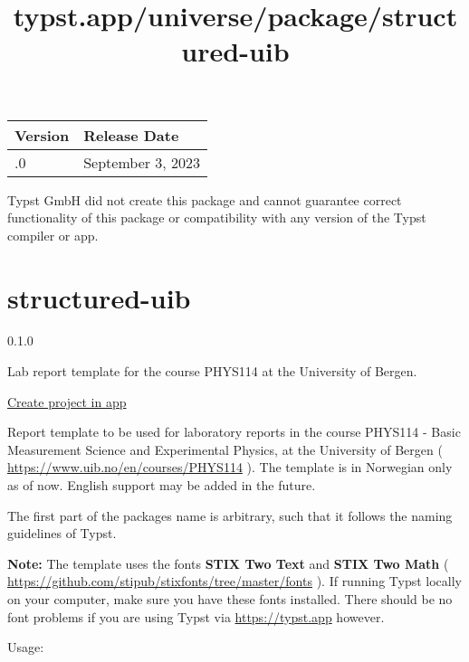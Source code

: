 \begin{longtable}[]{@{}ll@{}}
\toprule\noalign{}
Version & Release Date \\
\midrule\noalign{}
\endhead
\bottomrule\noalign{}
\endlastfoot
0.1.0 & September 3, 2023 \\
\end{longtable}

Typst GmbH did not create this package and cannot guarantee correct
functionality of this package or compatibility with any version of the
Typst compiler or app.


\title{typst.app/universe/package/structured-uib}

\label{banner}
\label{template-thumbnail}

\section{structured-uib}\label{structured-uib}

{ 0.1.0 }

Lab report template for the course PHYS114 at the University of Bergen.

\href{/app?template=structured-uib&version=0.1.0}{Create project in app}

\label{readme}
Report template to be used for laboratory reports in the course PHYS114
- Basic Measurement Science and Experimental Physics, at the University
of Bergen ( \url{https://www.uib.no/en/courses/PHYS114} ). The template
is in Norwegian only as of now. English support may be added in the
future.

The first part of the packages name is arbitrary, such that it follows
the naming guidelines of Typst.

\textbf{Note:} The template uses the fonts \textbf{STIX Two Text} and
\textbf{STIX Two Math} (
\url{https://github.com/stipub/stixfonts/tree/master/fonts} ). If
running Typst locally on your computer, make sure you have these fonts
installed. There should be no font problems if you are using Typst via
\href{https://typst.app/}{https://typst.app} however.

Usage:


